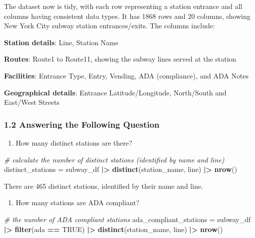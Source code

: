 \documentclass[
]{article}
\newenvironment{Shaded}{\begin{snugshade}}{\end{snugshade}}
\newcommand{\CommentTok}[1]{\textcolor[rgb]{0.56,0.35,0.01}{\textit{#1}}}
\newcommand{\ConstantTok}[1]{\textcolor[rgb]{0.56,0.35,0.01}{#1}}
\newcommand{\FunctionTok}[1]{\textcolor[rgb]{0.13,0.29,0.53}{\textbf{#1}}}
\newcommand{\NormalTok}[1]{#1}
\newcommand{\OtherTok}[1]{\textcolor[rgb]{0.56,0.35,0.01}{#1}}
\newcommand{\SpecialCharTok}[1]{\textcolor[rgb]{0.81,0.36,0.00}{\textbf{#1}}}
\providecommand{\tightlist}{%
  \setlength{\itemsep}{0pt}\setlength{\parskip}{0pt}}
\begin{document}
The dataset now is tidy, with each row representing a station entrance
and all columns having consistent data types. It has 1868 rows and 20
columns, showing New York City subway station entrances/exits. The
columns include:

\textbf{Station details}: Line, Station Name

\textbf{Routes}: Route1 to Route11, showing the subway lines served at
the station

\textbf{Facilities}: Entrance Type, Entry, Vending, ADA (compliance),
and ADA Notes

\textbf{Geographical details}: Entrance Latitude/Longitude, North/South
and East/West Streets

\subsubsection{1.2 Answering the Following
Question}\label{answering-the-following-question}

\begin{enumerate}
\def\labelenumi{\arabic{enumi}.}
\tightlist
\item
  How many distinct stations are there?
\end{enumerate}

\begin{Shaded}
\begin{Highlighting}[]
\CommentTok{\# calculate the number of distinct stations (identified by name and line)}
\NormalTok{distinct\_stations }\OtherTok{=}\NormalTok{ subway\_df }\SpecialCharTok{|\textgreater{}}
  \FunctionTok{distinct}\NormalTok{(station\_name, line) }\SpecialCharTok{|\textgreater{}}
  \FunctionTok{nrow}\NormalTok{()}
\end{Highlighting}
\end{Shaded}

There are 465 distinct stations, identified by their name and line.

\begin{enumerate}
\def\labelenumi{\arabic{enumi}.}
\setcounter{enumi}{1}
\tightlist
\item
  How many stations are ADA compliant?
\end{enumerate}

\begin{Shaded}
\begin{Highlighting}[]
\CommentTok{\# the number of ADA compliant stations}
\NormalTok{ada\_compliant\_stations }\OtherTok{=}\NormalTok{ subway\_df }\SpecialCharTok{|\textgreater{}}
  \FunctionTok{filter}\NormalTok{(ada }\SpecialCharTok{==} \ConstantTok{TRUE}\NormalTok{) }\SpecialCharTok{|\textgreater{}}
  \FunctionTok{distinct}\NormalTok{(station\_name, line) }\SpecialCharTok{|\textgreater{}}
  \FunctionTok{nrow}\NormalTok{()}
\end{Highlighting}
\end{Shaded}
\end{document}
